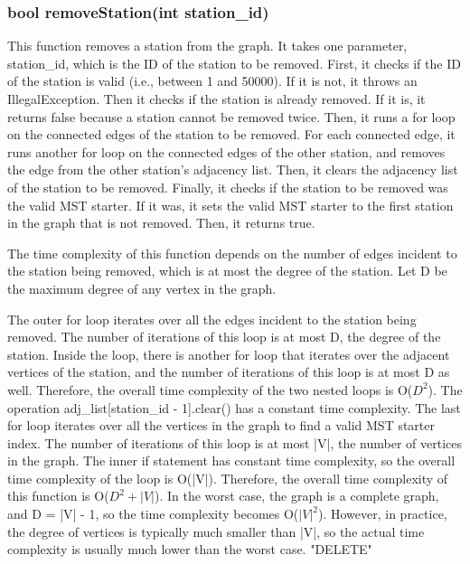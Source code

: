 		\subsubsection{{\color{orange}bool} {\color{draculapurple}removeStation}({\color{draculapurple}int} station\_id)}
			
			This function removes a station from the graph. It takes one parameter, {\color{draculapurple}station\_id}, which is the ID of the station to be removed.
			First, it checks if the ID of the station is valid (i.e., between 1 and 50000). If it is not, it throws an {\color{draculapurple}IllegalException}.
			Then it checks if the station is already removed. If it is, it returns {\color{draculapurple}false} because a station cannot be removed twice.
			Then, it runs a for loop on the connected edges of the station to be removed. For each connected edge, it runs another for loop on the connected edges of the other station, and removes the edge from the other station's adjacency list.
			Then, it clears the adjacency list of the station to be removed.
			Finally, it checks if the station to be removed was the valid MST starter. If it was, it sets the valid MST starter to the first station in the graph that is not removed.
			Then, it returns {\color{draculapurple}true}.

			The time complexity of this function depends on the number of edges incident to the station being removed, which is at most the degree of the station. Let D be the maximum degree of any vertex in the graph.

			The outer for loop iterates over all the edges incident to the station being removed. The number of iterations of this loop is at most {\color{draculapurple}D}, the degree of the station. Inside the loop, there is another for loop that iterates over the adjacent vertices of the station, and the number of iterations of this loop is at most {\color{draculapurple}D} as well. Therefore, the overall time complexity of the two nested loops is {\color{lightblue}O($D^2$)}.
			The operation {\color{draculapurple}adj\_list[station\_id - 1].clear()} has a constant time complexity.
			The last for loop iterates over all the vertices in the graph to find a valid MST starter index. The number of iterations of this loop is at most {\color{draculapurple}|V|}, the number of vertices in the graph. The inner if statement has constant time complexity, so the overall time complexity of the loop is {\color{lightblue}O(|V|)}.
			Therefore, the overall time complexity of this function is {\color{lightblue}O($D^2 + |V|$)}.
			In the worst case, the graph is a complete graph, and {\color{draculapurple}D = |V| - 1}, so the time complexity becomes {\color{lightblue}O($|V|^2$)}. However, in practice, the degree of vertices is typically much smaller than {\color{draculapurple}|V|}, so the actual time complexity is usually much lower than the worst case.
			{\color{GoldenYellow}"DELETE"}

